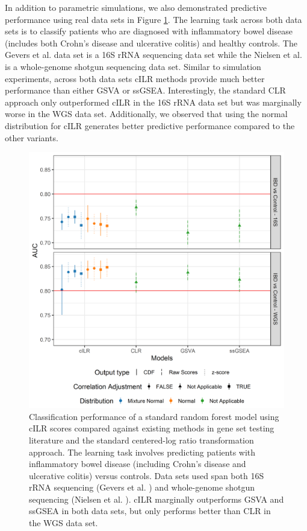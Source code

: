 \documentclass{article}
\begin{document}
In addition to parametric simulations, we also demonstrated predictive performance using real data sets in Figure \ref{fig:7}. The learning task across both data sets is to classify patients who are diagnosed with inflammatory bowel disease (includes both Crohn's disease and ulcerative colitis) and healthy controls. The Gevers et al. \cite{gevers2014} data set is a 16S rRNA sequencing data set while the Nielsen et al. \cite{nielsen2014} is a whole-genome shotgun sequencing data set. Similar to simulation experiments, across both data sets cILR methods provide much better performance than either GSVA or ssGSEA. Interestingly, the standard CLR approach only outperformed cILR in the 16S rRNA data set but was marginally worse in the WGS data set. Additionally, we observed that using the normal distribution for cILR generates better predictive performance compared to the other variants.

\begin{figure}[H]
    \centering
    \includegraphics[scale = 0.6]{figures/data_prediction_plot.png}
    \caption{Classification performance of a standard random forest model using cILR scores compared against existing methods in gene set testing literature and the standard centered-log ratio transformation approach. The learning task involves predicting patients with inflammatory bowel disease (including Crohn's disease and ulcerative colitis) versus controls. Data sets used span both 16S rRNA sequencing (Gevers et al. \cite{gevers2014}) and whole-genome shotgun sequencing (Nielsen et al. \cite{nielsen2014}). cILR marginally outperforms GSVA and ssGSEA in both data sets, but only performs better than CLR in the WGS data set.}
    \label{fig:7}
\end{figure}
\end{document}
